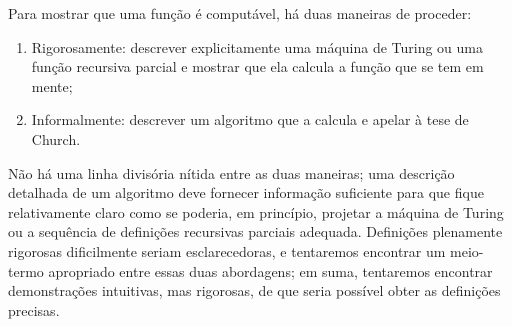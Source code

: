 \documentclass[../../../include/open-logic-section]{subfiles}
\begin{document}
Para mostrar que uma função é computável, há
duas maneiras de proceder:
\begin{enumerate}
\item Rigorosamente: descrever explicitamente uma máquina de Turing ou
  uma função recursiva parcial e mostrar que ela calcula a função que
  se tem em mente;
\item Informalmente: descrever um algoritmo que a calcula e apelar à
  tese de Church.
\end{enumerate}
Não há uma linha divisória nítida entre as duas maneiras; uma descrição
detalhada de um algoritmo deve fornecer informação suficiente para que
fique relativamente claro como se poderia, em princípio, projetar a
máquina de Turing ou a sequência de definições recursivas parciais
adequada. Definições plenamente rigorosas dificilmente seriam
esclarecedoras, e tentaremos encontrar um meio-termo apropriado entre
essas duas abordagens; em suma, tentaremos encontrar demonstrações
intuitivas, mas rigorosas, de que seria possível obter as definições
precisas.
\end{document}

